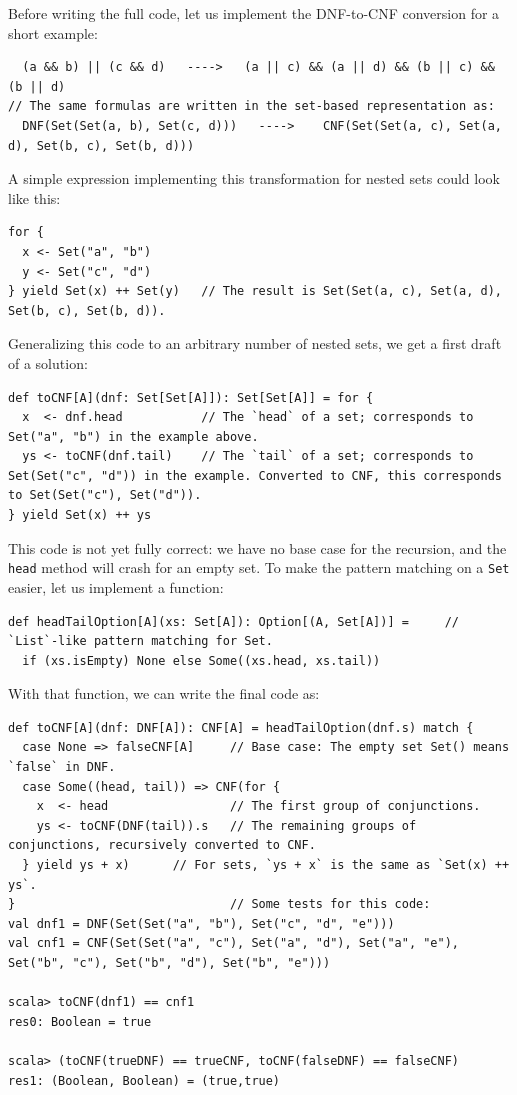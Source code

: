 Before writing the full code, let us implement the DNF-to-CNF conversion
for a short example: 
\begin{lstlisting}
  (a && b) || (c && d)   ---->   (a || c) && (a || d) && (b || c) && (b || d)
// The same formulas are written in the set-based representation as:
  DNF(Set(Set(a, b), Set(c, d)))   ---->    CNF(Set(Set(a, c), Set(a, d), Set(b, c), Set(b, d)))
\end{lstlisting}
A simple expression implementing this transformation for nested sets
could look like this: 
\begin{lstlisting}
for {
  x <- Set("a", "b")
  y <- Set("c", "d")
} yield Set(x) ++ Set(y)   // The result is Set(Set(a, c), Set(a, d), Set(b, c), Set(b, d)).
\end{lstlisting}
Generalizing this code to an arbitrary number of nested sets, we get
a first draft of a solution:
\begin{lstlisting}
def toCNF[A](dnf: Set[Set[A]]): Set[Set[A]] = for {
  x  <- dnf.head           // The `head` of a set; corresponds to Set("a", "b") in the example above.
  ys <- toCNF(dnf.tail)    // The `tail` of a set; corresponds to Set(Set("c", "d")) in the example. Converted to CNF, this corresponds to Set(Set("c"), Set("d")).
} yield Set(x) ++ ys  
\end{lstlisting}
This code is not yet fully correct: we have no base case for the recursion,
and the \lstinline!head! method will crash for an empty set. To make
the pattern matching on a \lstinline!Set! easier, let us implement
a function:
\begin{lstlisting}
def headTailOption[A](xs: Set[A]): Option[(A, Set[A])] =     // `List`-like pattern matching for Set.
  if (xs.isEmpty) None else Some((xs.head, xs.tail))
\end{lstlisting}
With that function, we can write the final code as:
\begin{lstlisting}
def toCNF[A](dnf: DNF[A]): CNF[A] = headTailOption(dnf.s) match {
  case None => falseCNF[A]     // Base case: The empty set Set() means `false` in DNF.
  case Some((head, tail)) => CNF(for {
    x  <- head                 // The first group of conjunctions.
    ys <- toCNF(DNF(tail)).s   // The remaining groups of conjunctions, recursively converted to CNF.
  } yield ys + x)      // For sets, `ys + x` is the same as `Set(x) ++ ys`.
}                              // Some tests for this code:
val dnf1 = DNF(Set(Set("a", "b"), Set("c", "d", "e")))
val cnf1 = CNF(Set(Set("a", "c"), Set("a", "d"), Set("a", "e"), Set("b", "c"), Set("b", "d"), Set("b", "e")))

scala> toCNF(dnf1) == cnf1
res0: Boolean = true 

scala> (toCNF(trueDNF) == trueCNF, toCNF(falseDNF) == falseCNF)
res1: (Boolean, Boolean) = (true,true)
\end{lstlisting}
